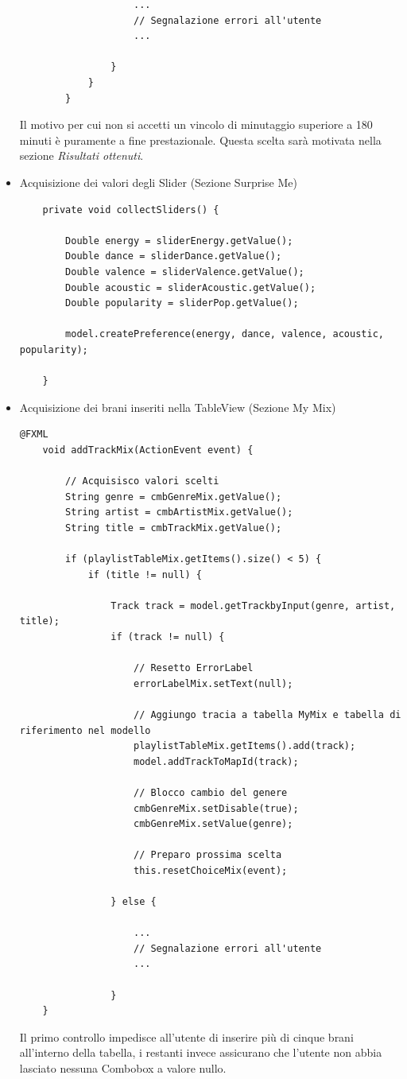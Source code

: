 \documentclass[12pt, a4paper]{article}
\begin{document}
\begin{itemize}
\begin{lstlisting}
					...
					// Segnalazione errori all'utente
					...
					
				}
			}
		}
\end{lstlisting}

Il motivo per cui non si accetti un vincolo di minutaggio superiore a 180 minuti è puramente a fine prestazionale. Questa scelta sarà motivata nella sezione \textit{Risultati ottenuti}.

\item Acquisizione dei valori degli Slider (Sezione Surprise Me)
\begin{lstlisting}
	private void collectSliders() {

		Double energy = sliderEnergy.getValue();
		Double dance = sliderDance.getValue();
		Double valence = sliderValence.getValue();
		Double acoustic = sliderAcoustic.getValue();
		Double popularity = sliderPop.getValue();

		model.createPreference(energy, dance, valence, acoustic, popularity);
		
	}
\end{lstlisting}
\newpage
\item Acquisizione dei brani inseriti nella TableView (Sezione My Mix)
\begin{lstlisting}
@FXML
	void addTrackMix(ActionEvent event) {

		// Acquisisco valori scelti
		String genre = cmbGenreMix.getValue();
		String artist = cmbArtistMix.getValue();
		String title = cmbTrackMix.getValue();

		if (playlistTableMix.getItems().size() < 5) {
			if (title != null) {

				Track track = model.getTrackbyInput(genre, artist, title);
				if (track != null) {

					// Resetto ErrorLabel
					errorLabelMix.setText(null);

					// Aggiungo tracia a tabella MyMix e tabella di riferimento nel modello
					playlistTableMix.getItems().add(track);
					model.addTrackToMapId(track);

					// Blocco cambio del genere
					cmbGenreMix.setDisable(true);
					cmbGenreMix.setValue(genre);

					// Preparo prossima scelta
					this.resetChoiceMix(event);

				} else {
				
					...
					// Segnalazione errori all'utente
					...
					
				}
	}

\end{lstlisting}
Il primo controllo impedisce all'utente di inserire più di cinque brani all'interno della tabella, i restanti invece assicurano che l'utente non abbia lasciato nessuna Combobox a valore nullo. 


\end{itemize}
\end{document}
